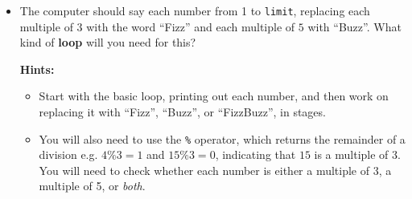 \documentclass[11pt]{report}
\begin{document}
\begin{Exercise}[title=For Loops (Essential)]
{\begin{itemize}
	\item The computer should say each number from 1 to {\tt limit}, replacing each multiple of $3$ with the word ``Fizz'' and each multiple of $5$ with ``Buzz''.
	What kind of \textbf{loop} will you need for this?

	
	\textbf{Hints:} 
	
	\begin{itemize}
    	\item Start with the basic loop, printing out each number, and then work on replacing it with ``Fizz'', ``Buzz'', or ``FizzBuzz'', in stages.
    	\item You will also need to use the {\tt \%} operator, which returns the remainder of a division e.g. $4\%3 = 1$ and $15\%3 = 0$, indicating that $15$ is a multiple of $3$. You will need to check whether each number is either a multiple of 3, a multiple of 5, or \emph{both}.
	\end{itemize}
	
	\end{itemize}
	}
    
          
          

\end{Exercise}

\end{document}
